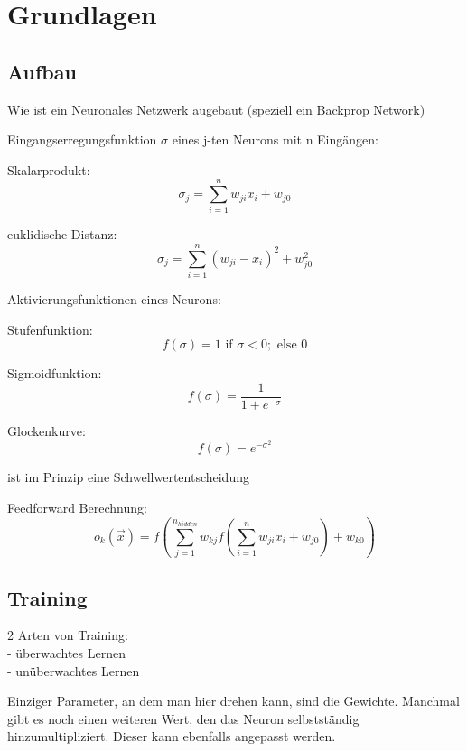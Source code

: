 \section{Grundlagen}

\subsection{Aufbau}
Wie ist ein Neuronales Netzwerk augebaut (speziell ein Backprop Network)

Eingangserregungsfunktion $\sigma$ eines j-ten Neurons mit n Eingängen:

Skalarprodukt:
\begin{equation}
  \sigma_{j} = \sum_{i=1}^{n} w_{ji} x_{i}+w_{j0}
\end{equation} 

euklidische Distanz:
\begin{equation}
  \sigma_{j} = \sum_{i=1}^{n} (w_{ji} - x_{i})^2+w_{j0}^2
\end{equation} 

Aktivierungsfunktionen eines Neurons:

Stufenfunktion:
\begin{equation}
f(\sigma) = 1 \mbox{ if } \sigma < 0;  \mbox{ else } 0
\end{equation}

Sigmoidfunktion:
\begin{equation}
f(\sigma) = \frac{1}{1+e^{-\sigma}}
\end{equation}

Glockenkurve:
\begin{equation}
f(\sigma) = e^{-\sigma^2}
\end{equation}

ist im Prinzip eine Schwellwertentscheidung

Feedforward Berechnung:
\begin{equation}
o_{k}(\vec{x})=f\left( \sum_{j=1}^{n_{hidden}} w_{kj} f\left(\sum_{i=1}^{n} w_{ji}x_{i}+w_{j0} \right)+w_{k0} \right)
\end{equation}

\subsection{Training}

2 Arten von Training:
 \\- überwachtes Lernen
 \\- unüberwachtes Lernen
 
 Einziger Parameter, an dem man hier drehen kann, sind die Gewichte. Manchmal gibt es noch einen weiteren Wert, den das Neuron selbstständig hinzumultipliziert. Dieser kann ebenfalls angepasst werden.
 
